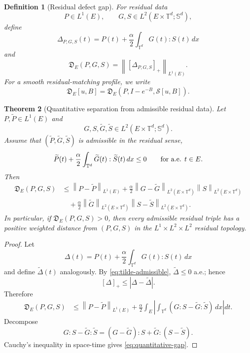 \documentclass[11pt]{article}
\numberwithin{equation}{section}
\newtheorem{theorem}{Theorem}[section]
\newtheorem{definition}[theorem]{Definition}
\newcommand{\T}{\mathbb T}
\newcommand{\Sym}{\mathbb S}
\newcommand{\norm}[1]{\left\lVert #1\right\rVert}
\begin{document}
\begin{definition}[Residual defect gap]
\label{def:residual-defect-gap}
For residual data
\[
  P\in L^1(E),\qquad G,S\in L^2(E\times\T^d;\Sym^d),
\]
define
\[
  \Delta_{P,G,S}(t)
  =
  P(t)+\frac{\alpha}{2}\int_{\T^d}G(t):S(t)\,dx
\]
and
\begin{equation}
  \mathfrak D_E(P,G,S)
  =
  \norm{[\Delta_{P,G,S}]_+}_{L^1(E)}.
  \label{eq:defect-gap}
\end{equation}
For a smooth residual-matching profile, we write
\[
  \mathfrak D_E[u,B]
  =
  \mathfrak D_E(P,I-e^{-B},\mathcal S[u,B]).
\]
\end{definition}

\begin{theorem}[Quantitative separation from admissible residual data]
\label{thm:quantitative-gap}
Let \(P,\widetilde P\in L^1(E)\) and
\[
  G,S,\widetilde G,\widetilde S\in L^2(E\times\T^d;\Sym^d).
\]
Assume that \((\widetilde P,\widetilde G,\widetilde S)\) is admissible in the
residual sense,
\begin{equation}
  \widetilde P(t)+\frac{\alpha}{2}
  \int_{\T^d}\widetilde G(t):\widetilde S(t)\,dx\le0
  \qquad\hbox{for a.e. }t\in E .
  \label{eq:tilde-admissible}
\end{equation}
Then
\begin{equation}
\begin{aligned}
  \mathfrak D_E(P,G,S)
  &\le
  \norm{P-\widetilde P}_{L^1(E)}
  +\frac{\alpha}{2}
   \norm{G-\widetilde G}_{L^2(E\times\T^d)}
   \norm{S}_{L^2(E\times\T^d)}\\
  &\quad
  +\frac{\alpha}{2}
   \norm{\widetilde G}_{L^2(E\times\T^d)}
   \norm{S-\widetilde S}_{L^2(E\times\T^d)} .
  \label{eq:quantitative-gap}
\end{aligned}
\end{equation}
In particular, if \(\mathfrak D_E(P,G,S)>0\), then every admissible residual
triple has a positive weighted distance from \((P,G,S)\) in the
\(L^1\times L^2\times L^2\) residual topology.
\end{theorem}

\begin{proof}
Let
\[
  \Delta(t)=P(t)+\frac{\alpha}{2}\int_{\T^d}G(t):S(t)\,dx
\]
and define \(\widetilde\Delta(t)\) analogously.  By
\eqref{eq:tilde-admissible}, \(\widetilde\Delta\le0\) a.e.; hence
\[
  [\Delta]_+\le |\Delta-\widetilde\Delta| .
\]
Therefore
\[
\begin{aligned}
  \mathfrak D_E(P,G,S)
  &\le
  \norm{P-\widetilde P}_{L^1(E)}
  +\frac{\alpha}{2}
  \int_E
  \left|
  \int_{\T^d}(G:S-\widetilde G:\widetilde S)\,dx
  \right|dt .
\end{aligned}
\]
Decompose
\[
  G:S-\widetilde G:\widetilde S
  =
  (G-\widetilde G):S+\widetilde G:(S-\widetilde S).
\]
Cauchy's inequality in space-time gives \eqref{eq:quantitative-gap}.
\end{proof}
\end{document}
